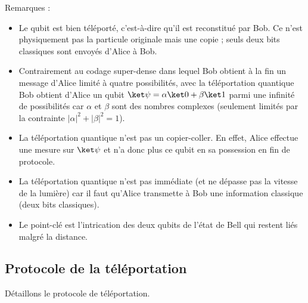 \documentclass[11pt,class=report,crop=false]{standalone}
\begin{document}

Remarques :
\begin{itemize}
  \item Le qubit est bien \og{}téléporté\fg{}, c'est-à-dire qu'il est reconstitué par Bob. Ce n'est physiquement pas la particule originale mais une copie ; seuls deux bits classiques sont envoyés d'Alice à Bob.

  \item Contrairement au codage super-dense dans lequel Bob obtient à la fin  un message d'Alice limité à quatre possibilités, avec la téléportation quantique Bob obtient d'Alice un qubit $\ket\psi = \alpha\ket0 + \beta\ket1$ parmi une infinité de possibilités car $\alpha$ et $\beta$ sont des nombres complexes (seulement limités par la contrainte $|\alpha|^2+|\beta|^2=1$).
  
  \item La téléportation quantique n'est pas un \og{}copier-coller\fg{}. En effet, Alice effectue une mesure sur $\ket\psi$ et n'a donc plus ce qubit en sa possession en fin de protocole.

  \item La téléportation quantique n'est pas immédiate (et ne dépasse pas la vitesse de la lumière) car il faut qu'Alice transmette à Bob une information classique (deux bits classiques).

  \item Le point-clé est l'intrication des deux qubits de l'état de Bell qui restent liés malgré la distance.

\end{itemize}


\subsection{Protocole de la téléportation}

Détaillons le protocole de téléportation.


\end{document}
